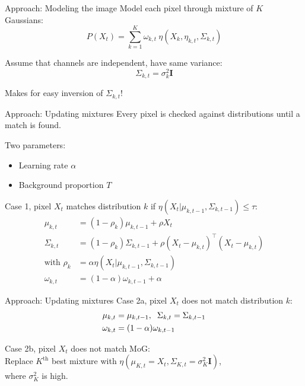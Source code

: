 \documentclass{beamer}
\begin{document}
\begin{frame}{Approach: Modeling the image}
Model each pixel through mixture of $K$ Gaussians:
\begin{equation*}
P(X_t) = \sum^K_{k=1} \omega_{k,t}~\eta
	(X_k, \eta_{k, t}, \Sigma_{k,t})
\end{equation*} %

Assume that channels are independent, have same variance:
\begin{equation*}
\Sigma_{k,t} = \sigma_k^2 \textbf{I}
\end{equation*}

Makes for easy inversion of $\Sigma_{k,t}$! %
\end{frame}

\begin{frame}{Approach: Updating mixtures}
Every pixel is checked against distributions until a match is found.\vspace{5mm}

Two parameters: 
\begin{itemize}
\item Learning rate $\alpha$
\item Background proportion $T$
\end{itemize}
\vspace{5mm}

Case 1, pixel $X_t$ matches distribution $k$ if $\eta(X_t|\mu_{k,t-1}, \Sigma_{k, t-1}) \leq \tau$: \vspace{-3mm}
\begin{align*}
  \mu_{k,t} &= (1 - \rho_k) \mu_{k, t-1} + \rho X_t \\
  \Sigma_{k,t} &= (1 - \rho_k) \Sigma_{k,t-1} + \rho (X_t - \mu_{k,t})^\top (X_t - \mu_{k,t}) \\
\text{with }  \rho_k &= \alpha \eta(X_t | \mu_{k, t-1}, \Sigma_{k,t-1}) \\
\omega_{k,t} &= (1-\alpha) \omega_{k,t-1} + \alpha 
\end{align*}
\end{frame}

\begin{frame}{Approach: Updating mixtures}
Case 2a, pixel $X_t$ does not match distribution $k$: \vspace{-3mm}
\begin{align*}
  \mu_{k,t} &= \mu_{k, t-1} , \hspace{2mm} \Sigma_{k,t} =  \Sigma_{k,t-1} \\
\omega_{k,t} &= (1-\alpha) \omega_{k,t-1}
\end{align*}

Case 2b, pixel $X_t$ does not match MoG: \\
      \hspace{1cm} Replace $K^{\text{th}}$ best mixture with $\eta(\mu_{K,t}=X_t, \Sigma_{K,t}=\sigma^2_{K} \textbf{I})$, \\
      \hspace{1cm} where $\sigma^2_K$ is high.
\end{frame}
\end{document}
